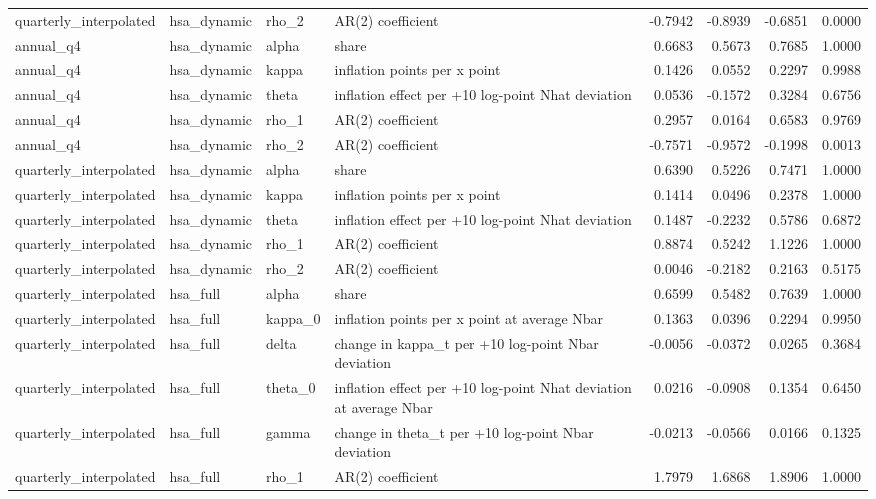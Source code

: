 \begin{tabular}{llllrrrr}
quarterly\_interpolated & hsa\_dynamic & rho\_2 & AR(2) coefficient & -0.7942 & -0.8939 & -0.6851 & 0.0000 \\
annual\_q4 & hsa\_dynamic & alpha & share & 0.6683 & 0.5673 & 0.7685 & 1.0000 \\
annual\_q4 & hsa\_dynamic & kappa & inflation points per x point & 0.1426 & 0.0552 & 0.2297 & 0.9988 \\
annual\_q4 & hsa\_dynamic & theta & inflation effect per +10 log-point Nhat deviation & 0.0536 & -0.1572 & 0.3284 & 0.6756 \\
annual\_q4 & hsa\_dynamic & rho\_1 & AR(2) coefficient & 0.2957 & 0.0164 & 0.6583 & 0.9769 \\
annual\_q4 & hsa\_dynamic & rho\_2 & AR(2) coefficient & -0.7571 & -0.9572 & -0.1998 & 0.0013 \\
quarterly\_interpolated & hsa\_dynamic & alpha & share & 0.6390 & 0.5226 & 0.7471 & 1.0000 \\
quarterly\_interpolated & hsa\_dynamic & kappa & inflation points per x point & 0.1414 & 0.0496 & 0.2378 & 1.0000 \\
quarterly\_interpolated & hsa\_dynamic & theta & inflation effect per +10 log-point Nhat deviation & 0.1487 & -0.2232 & 0.5786 & 0.6872 \\
quarterly\_interpolated & hsa\_dynamic & rho\_1 & AR(2) coefficient & 0.8874 & 0.5242 & 1.1226 & 1.0000 \\
quarterly\_interpolated & hsa\_dynamic & rho\_2 & AR(2) coefficient & 0.0046 & -0.2182 & 0.2163 & 0.5175 \\
quarterly\_interpolated & hsa\_full & alpha & share & 0.6599 & 0.5482 & 0.7639 & 1.0000 \\
quarterly\_interpolated & hsa\_full & kappa\_0 & inflation points per x point at average Nbar & 0.1363 & 0.0396 & 0.2294 & 0.9950 \\
quarterly\_interpolated & hsa\_full & delta & change in kappa\_t per +10 log-point Nbar deviation & -0.0056 & -0.0372 & 0.0265 & 0.3684 \\
quarterly\_interpolated & hsa\_full & theta\_0 & inflation effect per +10 log-point Nhat deviation at average Nbar & 0.0216 & -0.0908 & 0.1354 & 0.6450 \\
quarterly\_interpolated & hsa\_full & gamma & change in theta\_t per +10 log-point Nbar deviation & -0.0213 & -0.0566 & 0.0166 & 0.1325 \\
quarterly\_interpolated & hsa\_full & rho\_1 & AR(2) coefficient & 1.7979 & 1.6868 & 1.8906 & 1.0000 \\

\end{tabular}
